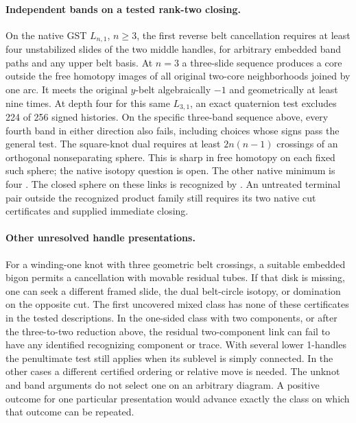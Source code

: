 \documentclass[11pt,letterpaper]{article}
\numberwithin{equation}{section}
\begin{document}
\paragraph{Independent bands on a tested rank-two closing.}
On the native GST \(L_{n,1}\), \(n\ge3\), the first reverse belt
cancellation requires at least four unstabilized slides of the two
middle handles, for arbitrary embedded band paths and any upper belt
basis. At \(n=3\) a three-slide sequence produces a core outside the
free homotopy images of all original two-core neighborhoods joined
by one arc. It meets the original \(y\)-belt algebraically \(-1\)
and geometrically at least nine times. At depth four for this same \(L_{3,1}\), an exact
quaternion test excludes 224 of 256 signed histories. On the specific
three-band sequence above, every fourth band in either direction also
fails, including choices whose signs pass the general test. The square-knot dual requires at least \(2n(n-1)\)
crossings of an orthogonal nonseparating sphere. This is sharp in
free homotopy on each fixed such sphere; the native isotopy question
is open. The other native minimum is four
\cite{GompfScharlemannThompson2010,Baker2026HandleCuts}.
The closed sphere on these links is recognized by
\cite[Theorem 1.1]{MeierZupan2022SquareKnots}. An untreated terminal
pair outside the recognized product family still requires its
two native cut certificates and supplied immediate closing.

\paragraph{Other unresolved handle presentations.}
For a winding-one knot with three geometric belt crossings, a
suitable embedded bigon permits a cancellation with movable residual
tubes. If that disk is missing, one can seek a different framed slide,
the dual belt-circle isotopy, or domination on the opposite cut.
The first uncovered mixed class has none of these certificates in
the tested descriptions. In the one-sided class with two components,
or after the three-to-two reduction above, the residual two-component
link can fail to have any identified recognizing component or trace.
With several lower 1-handles the penultimate test still applies
when its sublevel is simply connected. In the other cases a different
certified ordering or relative move is needed. The unknot and band arguments do not select one on an arbitrary
diagram. A positive outcome for one particular presentation would
advance exactly the class on which that outcome can be repeated.
\end{document}
